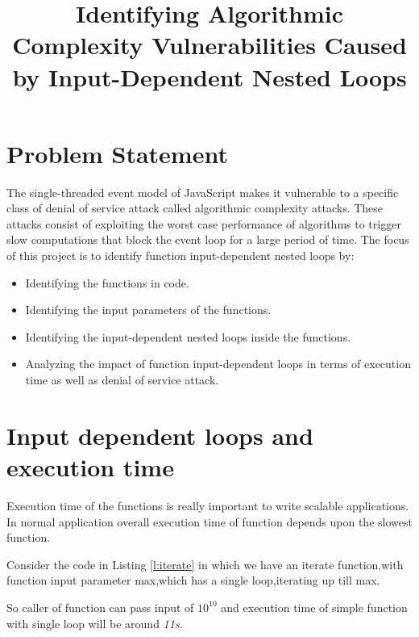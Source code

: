 \documentclass[authoryear,preprint]{sigplanconf}
\begin{document}
\setlength{\pdfpageheight}{\paperheight}
\setlength{\pdfpagewidth}{\paperwidth}


\title{Identifying Algorithmic Complexity Vulnerabilities Caused by
Input-Dependent Nested Loops}

\maketitle

\section{Problem Statement}
\label{sec:problemstatement}

The single-threaded event model of JavaScript makes it vulnerable
to a specific class of denial of service attack called algorithmic
complexity attacks. These attacks consist of exploiting the worst
case performance of algorithms to trigger slow computations that
block the event loop for a large period of time. The focus of this
project is to identify function input-dependent nested loops by:
\begin{itemize}
\item Identifying the functions in code.
\item Identifying the input parameters of the functions.
\item Identifying the input-dependent nested loops inside the functions.
\item Analyzing the impact of function input-dependent loops in terms
of execution time as well as denial of service attack.
\end{itemize}


\section{Input dependent loops and execution time}
\label{sec:introduction}
Execution time of the functions is really important to write scalable applications. In normal application overall execution time of function depends upon the slowest function.

Consider the code in Listing \ref{l:iterate} in which we have an iterate function,with function input parameter max,which has a single loop,iterating up till max.

So caller of function can pass input of \begin{math} 10^{10} \end{math} and execution time of simple function with single loop will be around \textit{11s}.
\end{document}
